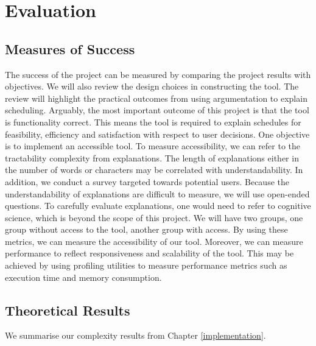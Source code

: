 \chapter{Evaluation}

\section{Measures of Success}

The success of the project can be measured by comparing the project results with objectives. We will also review the design choices in constructing the tool. The review will highlight the practical outcomes from using argumentation to explain scheduling.
\linespace
Arguably, the most important outcome of this project is that the tool is functionality correct. This means the tool is required to explain schedules for feasibility, efficiency and satisfaction with respect to user decisions.
\linespace
One objective is to implement an accessible tool. To measure accessibility, we can refer to the tractability complexity from explanations. The length of explanations either in the number of words or characters may be correlated with understandability. In addition, we conduct a survey targeted towards potential users. Because the understandability of explanations are difficult to measure, we will use open-ended questions. To carefully evaluate explanations, one would need to refer to cognitive science, which is beyond the scope of this project. We will have two groups, one group without access to the tool, another group with access. By using these metrics, we can measure the accessibility of our tool. Moreover, we can measure performance to reflect responsiveness and scalability of the tool. This may be achieved by using profiling utilities to measure performance metrics such as execution time and memory consumption. 

\section{Theoretical Results}

We summarise our complexity results from Chapter \ref{implementation}.


